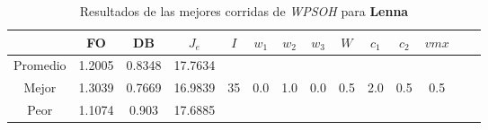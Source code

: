 \begin{table}[h!]
\footnotesize
\begin{center}
\begin{tabular}{|c|c|c|c|c|c|c|c|c|c|c|c|c|c|}
\hline
& {\bf FO} & {\bf DB}& $J_e$ & $I$ & $w_1$ & $w_2$ & $w_3$ & $W$ & $c_1$ & $c_2$ & $vmx$ \\
\hline
\hline
Promedio   & 1.2005 & 0.8348  & 17.7634 &  &  &  &  &  &  &  & \\
\cline{1-4}
Mejor & 1.3039 & 0.7669  & 16.9839 & 35 & 0.0 & 1.0 & 0.0 & 0.5 & 2.0 & 0.5 & 0.5\\
\cline{1-4}
Peor & 1.1074 & 0.903  & 17.6885 &  &  &  &  &  &  &  & \\\hline
\end{tabular}
\caption{Resultados de las mejores corridas de \emph{WPSOH} para {\bf Lenna}}
\label{tb:pmpwpsohibimg}
\end{center}
\end{table}
